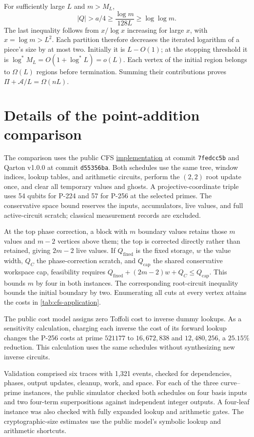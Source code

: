 \documentclass[11pt]{article}
\theoremstyle{definition}
\theoremstyle{remark}
\newcommand{\Area}{\mathcal A}
\begin{document}
For sufficiently large $L$ and $m>M_L$,
\[
|Q|>a/4\ge\frac{\log m}{128L}\ge\log\log m.
\]
The last inequality follows from $x/\log x$ increasing for large $x$, with $x=\log m>L^2$. Each partition therefore decreases the iterated logarithm of a piece's size by at most two. Initially it is $L-O(1)$; at the stopping threshold it is $\log^*M_L=O(1+\log^*L)=o(L)$. Each vertex of the initial region belongs to $\Omega(L)$ regions before termination. Summing their contributions proves $\Pi+\Area/L=\Omega(nL)$.

\section{Details of the point-addition comparison}
\label{app:application}

The comparison uses the public CFS \href{https://gitlab.inria.fr/capsule/qarton-projects/compressed-ec-dlog}{implementation} at commit \texttt{7fedcc5b} and Qarton v1.0.0 at commit \texttt{d55356ba}. Both schedules use the same tree, window indices, lookup tables, and arithmetic circuits, perform the $(2,2)$ root update once, and clear all temporary values and ghosts. A projective-coordinate triple uses 54 qubits for P-224 and 57 for P-256 at the selected primes. The conservative space bound reserves the inputs, accumulators, live values, and full active-circuit scratch; classical measurement records are excluded.

At the top phase correction, a block with $m$ boundary values retains those $m$ values and $m-2$ vertices above them; the top is corrected directly rather than retained, giving $2m-2$ live values. If $Q_{\mathrm{fixed}}$ is the fixed storage, $w$ the value width, $Q_C$ the phase-correction scratch, and $Q_{\mathrm{cap}}$ the shared conservative workspace cap, feasibility requires $Q_{\mathrm{fixed}}+(2m-2)w+Q_C\le Q_{\mathrm{cap}}$. This bounds $m$ by four in both instances. The corresponding root-circuit inequality bounds the initial boundary by two. Enumerating all cuts at every vertex attains the costs in \cref{tab:cfs-application}.

The public cost model assigns zero Toffoli cost to inverse dummy lookups. As a sensitivity calculation, charging each inverse the cost of its forward lookup changes the P-256 costs at prime $521177$ to $16{,}672{,}838$ and $12{,}480{,}256$, a $25.15\%$ reduction. This calculation uses the same schedules without synthesizing new inverse circuits.

Validation comprised six traces with 1,321 events, checked for dependencies, phases, output updates, cleanup, work, and space. For each of the three curve--prime instances, the public simulator checked both schedules on four basis inputs and two four-term superpositions against independent integer outputs. A four-leaf instance was also checked with fully expanded lookup and arithmetic gates. The cryptographic-size estimates use the public model's symbolic lookup and arithmetic shortcuts.

\printbibliography
\end{document}
